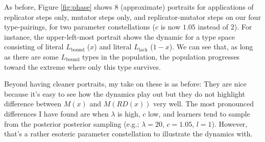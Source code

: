 \documentclass[fleqn,reqno,10pt]{article}
\newcommand{\mylang}[1]{\ensuremath{L_{\text{#1}}}\xspace} %
\newcommand{\Lbound}{\mylang{bound}}
\newcommand{\Llack}{\mylang{lack}}
\begin{document}
As before, Figure \ref{fig:phase} shows $8$ (approximate) portraits for applications of replicator steps only, mutator steps only, and replicator-mutator steps on our four type-pairings, for two parameter constellations ($c$ is now $1.05$ instead of $2$). For instance, the upper-left-most portrait shows the dynamic for a type space consisting of literal $\Lbound$ ($x$) and literal $\Llack$ ($1-x$). We can see that, as long as there are some $\Lbound$ types in the population, the population progresses toward the extreme where only this type survives. 

Beyond having cleaner portraits, my take on these is as before: They are nice because it's easy to see how the dynamics play out but they do not highlight difference between $M(x)$ and $M(RD(x))$ very well. The most pronounced differences I have found are when $\lambda$ is high, $c$ low, and learners tend to sample from the posterior posterior sampling (e.g.; $\lambda = 20$, $c = 1.05$, $l = 1$). However, that's a rather esoteric parameter constellation to illustrate the dynamics with. 
\end{document}

